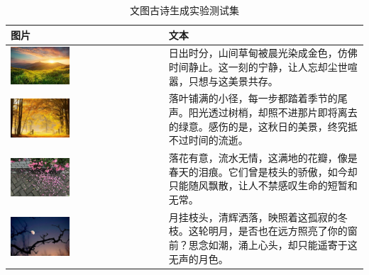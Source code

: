 \begin{longtable}{
  |>{\centering\arraybackslash}m{} %
  |>{\centering\arraybackslash}m{}|   %
}
\caption{文图古诗生成实验测试集} \label{tab:data_modality_test}\\
\hline
图片&文本\\
\hline
\endhead

\endfoot

\endlastfoot


\includegraphics[width=0.4\textwidth]{figures/图文测试/2.jpg} & 日出时分，山间草甸被晨光染成金色，仿佛时间静止。这一刻的宁静，让人忘却尘世喧嚣，只想与这美景共存。 \\
\hline
\includegraphics[width=0.4\textwidth]{figures/图文测试/3.jpg} & 落叶铺满的小径，每一步都踏着季节的尾声。阳光透过树梢，却照不进那片即将离去的绿意。感伤的是，这秋日的美景，终究抵不过时间的流逝。 \\
\hline
\includegraphics[width=0.4\textwidth]{figures/图文测试/4.jpg} & 落花有意，流水无情，这满地的花瓣，像是春天的泪痕。它们曾是枝头的骄傲，如今却只能随风飘散，让人不禁感叹生命的短暂和无常。 \\
\hline
\includegraphics[width=0.4\textwidth]{figures/图文测试/5.jpg} & 月挂枝头，清辉洒落，映照着这孤寂的冬枝。这轮明月，是否也在远方照亮了你的窗前？思念如潮，涌上心头，却只能遥寄于这无声的月色。 \\

\end{longtable}
